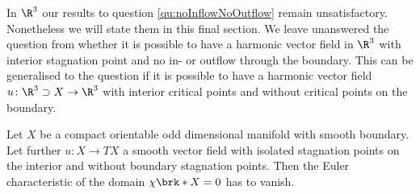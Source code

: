 In $\R^3$ our results to question \ref{qu:noInflowNoOutflow} remain unsatisfactory.
Nonetheless we will state them in this final section.
We leave unanswered the question from \cite[p.198]{Lortz1970} whether it is possible to have a harmonic vector field in $\R^3$ with
interior stagnation point and no in- or outflow through the boundary.
This can be generalised to the question if it is possible to have a harmonic vector field
$u\colon \R^3\supset X\to\R^3$ with interior critical points and 
without critical points on the boundary.
\begin{proposition}\label{pr:n3_domainCond}
  Let $X$ be a compact orientable odd dimensional manifold with smooth boundary.
  Let further $u\colon X\to TX$ a smooth vector field with isolated stagnation points on the interior and without
  boundary stagnation points. Then the Euler characteristic of the domain $\chi\brk*{X}=0$ has to vanish.
\end{proposition}
